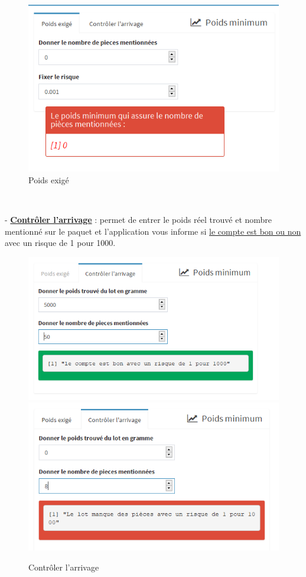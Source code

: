 \documentclass[12pt, a4paper]{thesis}
\begin{document}
\begin{figure}[!h]
\begin{center} 
\includegraphics[scale=0.7]{apppoi.PNG} 
\caption{Poids exigé}
\end{center}
\end{figure}\\

\item - \underline{\textbf{Contrôler l'arrivage}} : permet de entrer le poids réel trouvé et nombre mentionné sur le paquet et l'application vous informe si \underline{le compte est bon ou non} avec un risque de 1 pour 1000.

\begin{figure}[!h]
\includegraphics[scale=0.57]{appvalo}\includegraphics[scale=0.57]{appvaln}
\caption{Contrôler l'arrivage}
\end{figure}\\
 
\end{document}
